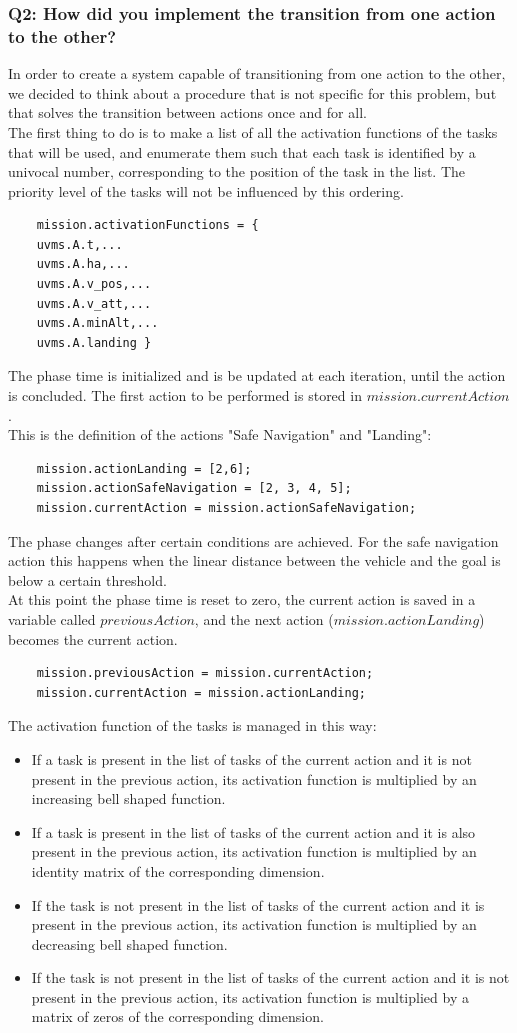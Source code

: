 \documentclass{article}
\begin{document}
\subsubsection{Q2: How did you implement the transition from one action to the other?}
In order to create a system capable of transitioning from one action to the other, we decided to think about a procedure that is not specific for this problem, but that solves the transition between actions once and for all.\\
The first thing to do is to make a list of all the activation functions of the tasks that will be used, and enumerate them such that each task is identified by a univocal number, corresponding to the position of the task in the list. The priority level of the tasks will not be influenced by this ordering.
\begin{lstlisting}
	mission.activationFunctions = {
	uvms.A.t,...
	uvms.A.ha,...
	uvms.A.v_pos,...
	uvms.A.v_att,...
	uvms.A.minAlt,...
	uvms.A.landing }
\end{lstlisting}
The phase time is initialized and is be updated at each iteration, until the action is concluded. The first action to be performed is stored in \(mission.currentAction\).\\
This is the definition of the actions "Safe Navigation" and "Landing":
\begin{lstlisting}
	mission.actionLanding = [2,6];
	mission.actionSafeNavigation = [2, 3, 4, 5];
	mission.currentAction = mission.actionSafeNavigation;
\end{lstlisting}
The phase changes after certain conditions are achieved. For the safe navigation action this happens when the linear distance between the vehicle and the goal is below a certain threshold.\\ 
At this point the phase time is reset to zero, the current action is saved in a variable called \(previousAction\), and the next action (\(mission.actionLanding\)) becomes the current action. 
\begin{lstlisting}
	mission.previousAction = mission.currentAction;
	mission.currentAction = mission.actionLanding;
\end{lstlisting}
The activation function of the tasks is managed in this way:
\begin{itemize}
	\item If a task is present in the list of tasks of the current action and it is not present in the previous action, its activation function is multiplied by an increasing bell shaped function.
	\item If a task is present in the list of tasks of the current action and it is also present in the previous action, its activation function is multiplied by an identity matrix of the corresponding dimension.
	\item If the task is not present in the list of tasks of the current action and it is present in the previous action, its activation function is multiplied by an decreasing bell shaped function.
	\item If the task is not present in the list of tasks of the current action and it is not present in the previous action, its activation function is multiplied by a matrix of zeros of the corresponding dimension.
\end{itemize}
\end{document}
